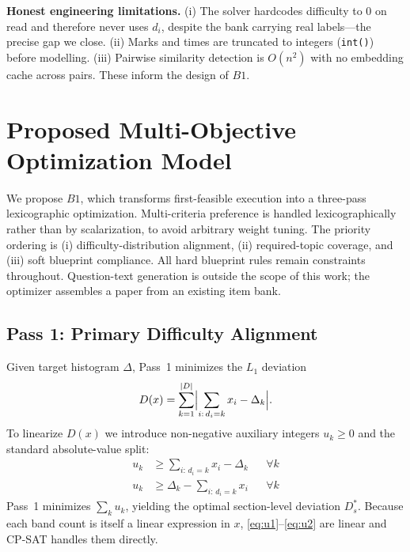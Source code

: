 \documentclass[runningheads]{llncs}
\begin{document}
\noindent\textbf{Honest engineering limitations.} (i) The solver hardcodes difficulty to $0$ on read and therefore never uses $d_i$, despite the bank carrying real labels---the precise gap we close.
(ii) Marks and times are truncated to integers (\texttt{int()}) before modelling.
(iii) Pairwise similarity detection is $O(n^2)$ with no embedding cache across pairs. These inform the design of $B1$.

\section{Proposed Multi-Objective Optimization Model}
\label{sec:proposed}

We propose $B1$, which transforms first-feasible execution into a three-pass lexicographic optimization.
Multi-criteria preference is handled lexicographically~\cite{ehrgott2005} rather than by scalarization, to avoid arbitrary weight tuning.
The priority ordering is (i) difficulty-distribution alignment, (ii) required-topic coverage, and (iii) soft blueprint compliance.
All hard blueprint rules remain constraints throughout. Question-text generation is outside the scope of this work;
the optimizer assembles a paper from an existing item bank.

\subsection{Pass 1: Primary Difficulty Alignment}
Given target histogram $\Delta$, Pass~1 minimizes the $L_1$ deviation
\begin{equation}
D(x)=\sum_{k=1}^{|D|}\Bigl|\sum_{i:\,d_i=k} x_i - \Delta_k\Bigr|.
\end{equation}
To linearize $D(x)$ we introduce non-negative auxiliary integers $u_k\ge 0$ and the standard absolute-value split:
\begin{align}
u_k &\ge \textstyle\sum_{i:\,d_i=k} x_i - \Delta_k &&\forall k \label{eq:u1}\\
u_k &\ge \Delta_k - \textstyle\sum_{i:\,d_i=k} x_i &&\forall k \label{eq:u2}
\end{align}
Pass~1 minimizes $\sum_k u_k$, yielding the optimal section-level deviation $D_s^\ast$.
Because each band count is itself a linear expression in $x$, \eqref{eq:u1}--\eqref{eq:u2} are linear and CP-SAT handles them directly.
\end{document}
